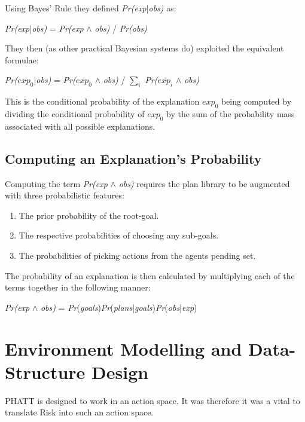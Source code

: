 \documentclass[parskip]{cs4rep}
\begin{document}
Using Bayes’ Rule they defined \textit{Pr(exp}|\textit{obs)} as:\newline

\centerline{
\textit{Pr(exp}|\textit{obs)} = \textit{Pr(exp} $\wedge$ \textit{obs)} / \textit{Pr(obs)}
}

They then (as other practical Bayesian systems do) exploited the equivalent formulae:\newline

\centerline{
\textit{Pr($exp_0$}|\textit{obs)} = \textit{Pr($exp_0$} $\wedge$ \textit{obs)} / $\displaystyle\sum\nolimits_{i}$ \textit{Pr($exp_i$} $\wedge$ \textit{obs)}
}

This is the conditional probability of the explanation $exp_0$ being computed by dividing the conditional probability of $exp_0$  by the sum of the probability mass associated with all possible explanations.

\subsection{Computing an Explanation's Probability}

Computing the term \textit{Pr(exp} $\wedge$ \textit{obs)} requires the plan library to be augmented with three probabilistic features:\newline

\begin{enumerate}
\item
The prior probability of the root-goal.
\item
The respective probabilities of choosing any sub-goals.
\item
The probabilities of picking actions from the agents pending set.
\end{enumerate}

The probability of an explanation is then calculated by multiplying each of the terms together in the following manner: \newline

\centerline{
\textit{Pr(exp} $\wedge$ \textit{obs)} = \textit{Pr}(\textit{goals})\textit{Pr}(\textit{plans}|\textit{goals})\textit{Pr}(\textit{obs}|\textit{exp})
}

\section{Environment Modelling and Data-Structure Design}

PHATT is designed to work in an action space. It was therefore it was a vital to translate Risk into such an action space. 
\end{document}
